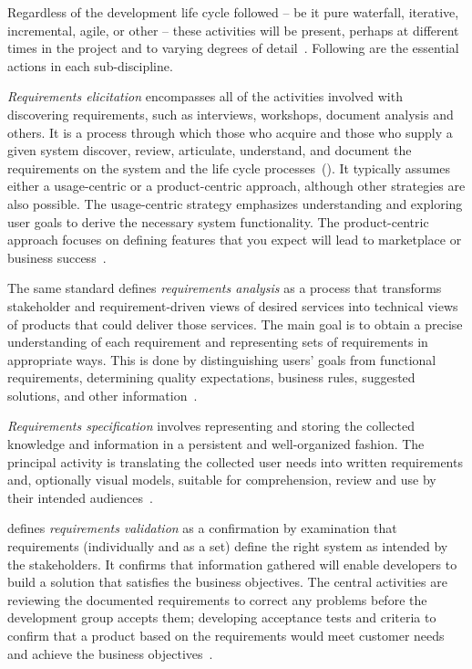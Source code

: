\documentclass[dissertation,final]{softeng}
\begin{document}
Regardless of the development life cycle followed -- be it pure waterfall, iterative, incremental, agile, or other -- these activities will be present, perhaps at different times in the project and to varying degrees of detail~\citep{Wiegers2013}. Following are the essential actions in each sub-discipline.

\emph{Requirements elicitation} encompasses all of the activities involved with discovering requirements, such as interviews, workshops, document analysis and others. It is a process through which those who acquire and those who supply a given system discover, review, articulate, understand, and document the requirements on the system and the life cycle processes~(). It typically assumes either a usage-centric or a product-centric approach, although other strategies are also possible. The usage-centric strategy emphasizes understanding and exploring user goals to derive the necessary system functionality. The product-centric approach focuses on defining features that you expect will lead to marketplace or business success~\citep{Wiegers2013}.

The same standard defines \emph{requirements analysis} as a process that transforms stakeholder and requirement-driven views of desired services into technical views of products that could deliver those services. The main goal is to obtain a precise understanding of each requirement and representing sets of requirements in appropriate ways. This is done by distinguishing users' goals from functional requirements, determining quality expectations, business rules, suggested solutions, and other information~\citep{Wiegers2013}.

\emph{Requirements specification} involves representing and storing the collected knowledge and information in a persistent and well-organized fashion. The principal activity is translating the collected user needs into written requirements and, optionally visual models, suitable for comprehension, review and use by their intended audiences~\citep{Wiegers2013}.

 defines \emph{requirements validation} as a confirmation by examination that requirements (individually and as a set) define the right system as intended by the stakeholders. It confirms that information gathered will enable developers to build a solution that satisfies the business objectives. The central activities are reviewing the documented requirements to correct any problems before the development group accepts them; developing acceptance tests and criteria to confirm that a product based on the requirements would meet customer needs and achieve the business objectives~\citep{Wiegers2013}.
\end{document}
